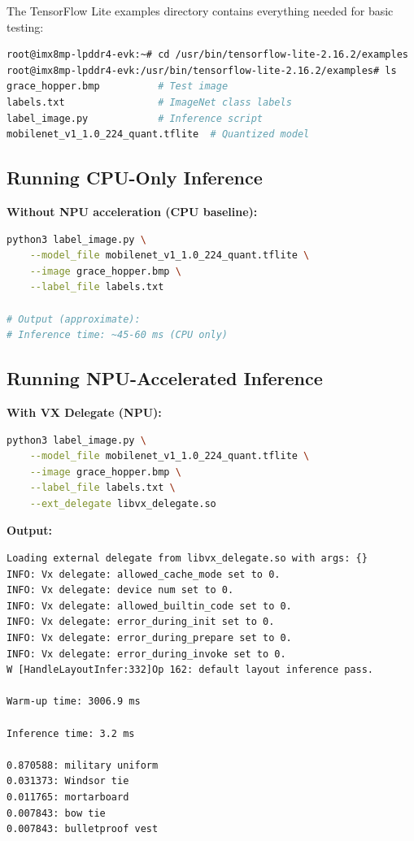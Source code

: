 \documentclass[12pt,a4paper]{report}
\begin{document}
The TensorFlow Lite examples directory contains everything needed for basic testing:

\begin{lstlisting}[language=bash]
root@imx8mp-lpddr4-evk:~# cd /usr/bin/tensorflow-lite-2.16.2/examples
root@imx8mp-lpddr4-evk:/usr/bin/tensorflow-lite-2.16.2/examples# ls
grace_hopper.bmp          # Test image
labels.txt                # ImageNet class labels
label_image.py            # Inference script
mobilenet_v1_1.0_224_quant.tflite  # Quantized model
\end{lstlisting}

\subsection{Running CPU-Only Inference}

\textbf{Without NPU acceleration (CPU baseline):}

\begin{lstlisting}[language=bash]
python3 label_image.py \
    --model_file mobilenet_v1_1.0_224_quant.tflite \
    --image grace_hopper.bmp \
    --label_file labels.txt

# Output (approximate):
# Inference time: ~45-60 ms (CPU only)
\end{lstlisting}

\subsection{Running NPU-Accelerated Inference}

\textbf{With VX Delegate (NPU):}

\begin{lstlisting}[language=bash]
python3 label_image.py \
    --model_file mobilenet_v1_1.0_224_quant.tflite \
    --image grace_hopper.bmp \
    --label_file labels.txt \
    --ext_delegate libvx_delegate.so
\end{lstlisting}

\textbf{Output:}
\begin{lstlisting}
Loading external delegate from libvx_delegate.so with args: {}
INFO: Vx delegate: allowed_cache_mode set to 0.
INFO: Vx delegate: device num set to 0.
INFO: Vx delegate: allowed_builtin_code set to 0.
INFO: Vx delegate: error_during_init set to 0.
INFO: Vx delegate: error_during_prepare set to 0.
INFO: Vx delegate: error_during_invoke set to 0.
W [HandleLayoutInfer:332]Op 162: default layout inference pass.

Warm-up time: 3006.9 ms

Inference time: 3.2 ms

0.870588: military uniform
0.031373: Windsor tie
0.011765: mortarboard
0.007843: bow tie
0.007843: bulletproof vest
\end{lstlisting}
\end{document}

